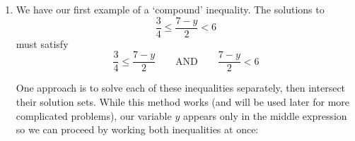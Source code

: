 \documentclass{ximera}
\begin{document}
\begin{example}
\begin{enumerate}
\[\begin{array}{rclr}
 \frac{7-8x}{2} & \geq & 4x + 1 & \\  

2\left( \frac{7-8x}{2}\right) & \geq & 2(4x + 1) & \text{Multiply by $2$} \\  

 \frac{\cancel{2}(7-8x)}{\cancel{2}} & \geq & 2(4x) + 2(1) & \text{Distribute} \\  

7 - 8x & \geq & 8x + 2 & \\

(7-8x) + 8x-2 & \geq & 8x+2 + 8x -2 & \text{Add $8x$, subtract $2$} \\

7 - 2 - 8x + 8x & \geq & 8x + 8x + 2 - 2 & \text{Rearrange terms} \\

5 & \geq &  16x & \text{$8x + 8x = (8+8)x = 16x$} \\  

 \frac{5}{16} & \geq &  \frac{16x}{16} & \text{Divide by the coefficient of $x$} \\ 

 \frac{5}{16} & \geq & x & \\ 

\end{array} \]

We get $\frac{5}{16} \geq x$ or, said differently,  $x \leq \frac{5}{16}$.  We express this set\footnote{Using set-builder notation, our `set' of solutions here is $\{ x \, | \, x \leq \frac{5}{16} \}$.} of real numbers as  $\left(-\infty, \frac{5}{16}\right]$. Though not required to do so, we could partially check our answer by substituting $x = \frac{5}{16}$ and a few other values in our solution set ($x =0$, for instance) to make sure the inequality holds.  (It also isn't a bad idea to choose an $x > \frac{5}{16}$, say $x = 1$, to see that the inequality \textit{doesn't} hold there.)  The only real way to actually show that our answer works for \textit{all} values in our solution set is to start with $x \leq \frac{5}{16}$ and reverse all of the steps in our solution procedure to prove it is equivalent to our original inequality.  

\item  We have our first example of a `compound' inequality.  The solutions to  \[  \frac{3}{4} \leq  \frac{7-y}{2} < 6 \] must satisfy \[  \frac{3}{4} \leq  \frac{7-y}{2} \qquad \text{AND} \qquad  \frac{7-y}{2} < 6\]

One approach is to solve each of these inequalities separately, then intersect their solution sets.  While this method works (and will be used later for more complicated problems), our variable $y$ appears only in the middle expression so we can proceed by working both inequalities at once:\[ \begin{array}{rclr}


\end{array}\]
\end{enumerate}
\end{example}
\end{document}
